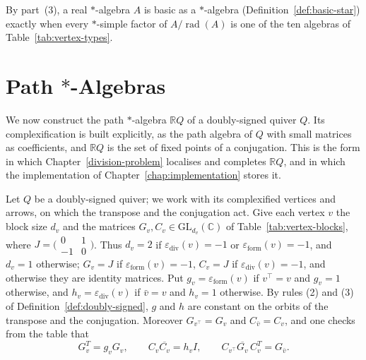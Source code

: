 \documentclass[12pt, a4paper]{report}
\theoremstyle{plain}
\theoremstyle{definition}
\theoremstyle{remark}
\theoremstyle{plain}
\newcommand{\rad}[0]{\operatorname{rad}} %
\newcommand{\epsilondiv}{\varepsilon_{\mathrm{div}}}
\newcommand{\epsilonform}{\varepsilon_{\mathrm{form}}}
\newcommand{\RR}{\mathbb{R}}
\newcommand{\CC}{\mathbb{C}}
\newcommand{\GL}{\mathrm{GL}}
\begin{document}
By part~(3), a real $*$-algebra $A$ is basic as a $*$-algebra (Definition~\ref{def:basic-star}) exactly when every $*$-simple factor of $A/\rad(A)$ is one of the ten algebras of Table~\ref{tab:vertex-types}.

\section{Path \texorpdfstring{$*$}{*}-Algebras}
\label{sec:path-star-algebras}
We now construct the path $*$-algebra $\RR Q$ of a doubly-signed quiver $Q$. Its complexification is built explicitly, as the path algebra of $Q$ with small matrices as coefficients, and $\RR Q$ is the set of fixed points of a conjugation. This is the form in which Chapter~\ref{division-problem} localises and completes $\RR Q$, and in which the implementation of Chapter~\ref{chap:implementation} stores it.

Let $Q$ be a doubly-signed quiver; we work with its complexified vertices and arrows, on which the transpose and the conjugation act. Give each vertex $v$ the block size $d_v$ and the matrices $G_v,C_v\in\GL_{d_v}(\CC)$ of Table~\ref{tab:vertex-blocks}, where $J=\bigl(\begin{smallmatrix}0&1\\-1&0\end{smallmatrix}\bigr)$. Thus $d_v=2$ if $\epsilondiv(v)=-1$ or $\epsilonform(v)=-1$, and $d_v=1$ otherwise; $G_v=J$ if $\epsilonform(v)=-1$, $C_v=J$ if $\epsilondiv(v)=-1$, and otherwise they are identity matrices. Put $g_v=\epsilonform(v)$ if $v^{\top}=v$ and $g_v=1$ otherwise, and $h_v=\epsilondiv(v)$ if $\bar v=v$ and $h_v=1$ otherwise. By rules (2) and (3) of Definition~\ref{def:doubly-signed}, $g$ and $h$ are constant on the orbits of the transpose and the conjugation. Moreover $G_{v^{\top}}=G_v$ and $C_{\bar v}=C_v$, and one checks from the table that
\begin{equation}\label{eq:vertex-data}
G_v^T=g_vG_v,\qquad C_v\overline{C_v}=h_vI,\qquad C_{v^{\top}}\overline{G_v}\,C_v^T=G_{\bar v}.
\end{equation}
\end{document}
